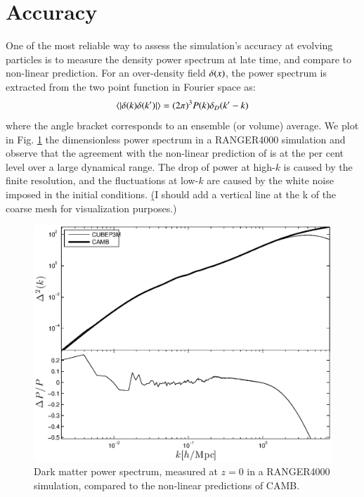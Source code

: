\section{Accuracy}
\label{sec:accuracy}
 
One of the most reliable way to assess the simulation's accuracy at evolving particles
is to measure the density power spectrum at late time, and compare to non-linear prediction. 
For an over-density field $\delta({\bf \it x})$, the power spectrum is extracted from the two point function in Fourier space as:
\begin{eqnarray}
\langle | \delta ({\bf \it k}) \delta ({\bf \it k'}) | \rangle = (2\pi)^{3}P(k)\delta_{D}({\bf \it k'} - {\bf \it k})
\label{eq:power}
\end{eqnarray}
where the angle bracket corresponds to an ensemble (or volume) average.
We plot in Fig. \ref{fig:power_highres} the dimensionless power spectrum in a RANGER4000 simulation and
observe that the agreement with the non-linear prediction of \cite{Lewis:1999bs} is at the per cent level over a large dynamical range.
The drop of power at high-$k$ is caused by the finite resolution, and the fluctuations at low-$k$ are caused by the white noise imposed in the initial conditions. {\b (I should add a vertical line at the k of the coarse mesh for visualization purposes.)}

\begin{figure}%
  \begin{center}
    \includegraphics[width=5.2in]{graphs/power_highres.eps}
  \caption{Dark matter power spectrum, measured at $z=0$ in a RANGER4000 simulation,
  compared to the non-linear predictions of {\small CAMB}.
    \label{fig:power_highres}}
\end{center}
\end{figure}

